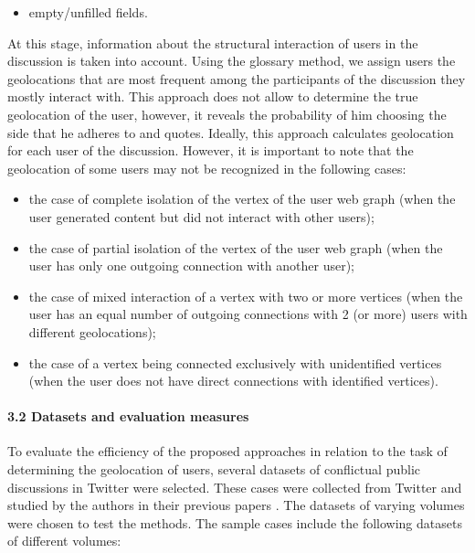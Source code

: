 \begin{enumerate}
\begin{itemize}
		\item empty/unfilled fields.
	\end{itemize}
	At this stage, information about the structural interaction of users in the discussion is taken into account. Using the glossary method, we assign users the geolocations that are most frequent among the participants of the discussion they mostly interact with. This approach does not allow to determine the true geolocation of the user, however, it reveals the probability of him choosing the side that he adheres to and quotes. Ideally, this approach calculates geolocation for each user of the discussion. However, it is important to note that the geolocation of some users may not be recognized in the following cases:
	\begin{itemize}
		\item the case of complete isolation of the vertex of the user web graph (when the user generated content but did not interact with other users);
		\item the case of partial isolation of the vertex of the user web graph (when the user has only one outgoing connection with another user);
		\item the case of mixed interaction of a vertex with two or more vertices (when the user has an equal number of outgoing connections with 2 (or more) users with different geolocations);
		\item the case of a vertex being connected exclusively with unidentified vertices (when the user does not have direct connections with identified vertices).
	\end{itemize}
\end{enumerate}

\paragraph{3.2 Datasets and evaluation measures} To evaluate the efficiency of the proposed approaches in relation to the task of determining the geolocation of users, several datasets of conflictual public discussions in Twitter were selected. These cases were collected from Twitter and studied by the authors in their previous papers \cite{BodrunovaLitvinenkoBlekanov,BodrunovaBlekanov,BodrunovaBlekanovSmoliarova}. The datasets of varying volumes were chosen to test the methods. The sample cases include the following datasets of different volumes:

